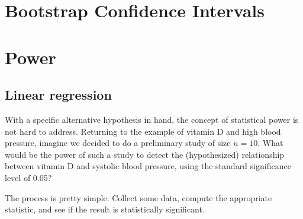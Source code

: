 \begin{center}
\begin{knitrout}
\end{knitrout}

\end{center}



\section{Bootstrap Confidence Intervals}
%

\section{Power}

\label{sec:power}

\subsection{Linear regression}
With a specific alternative hypothesis in hand, the concept of
statistical power is not hard to address.  Returning to the example of
vitamin D and high blood pressure, imagine we decided to do a
preliminary study of
size $n=10$.  What would be the power of such a study to detect the
(hypothesized) relationship between vitamin D and systolic blood
pressure, using the standard significance level of 0.05?

The process is pretty simple.  Collect some data, compute the
appropriate statistic, and see if the result is statistically significant.

